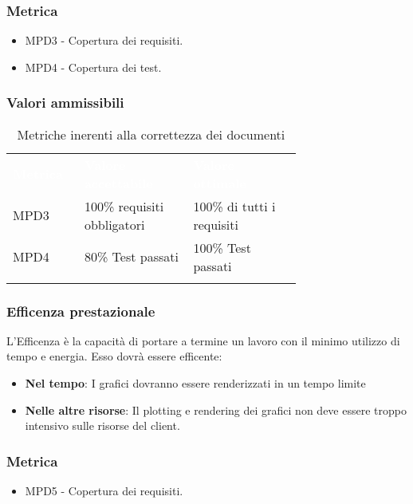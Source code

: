 \subsubsection{Metrica}
\begin{itemize}
    \item MPD3 - Copertura dei requisiti.
    \item MPD4 - Copertura dei test.
\end{itemize}
\subsubsection{Valori ammissibili}
\renewcommand{\arraystretch}{1.5}
\begin{longtable}{p{0.12\linewidth}p{0.30\linewidth}p{0.30\linewidth}}
	\rowcolor[RGB]{33, 73, 50}
	\textcolor{white}{\textbf{Metrica}} & \textcolor{white}{\textbf{Valore accettabile}} & \textcolor{white}{\textbf{Valore ottimale}}\\
    \rowcolor[RGB]{233, 245, 206}
    MPD3 & 100\% requisiti obbligatori & 100\% di tutti i requisiti\\ 
    \rowcolor[RGB]{216, 235, 171} 
    MPD4 & 80\% Test passati & 100\% Test passati\\ 
    \caption{Metriche inerenti alla correttezza dei documenti}
\end{longtable}	
\subsubsection{Efficenza prestazionale}
L'Efficenza è la capacità di portare a termine un lavoro con il minimo utilizzo di tempo e energia. Esso dovrà essere efficente:
\begin{itemize}
    \item \textbf{Nel tempo}: I grafici dovranno essere renderizzati in un tempo limite
    \item \textbf{Nelle altre risorse}: Il plotting e rendering dei grafici non deve essere troppo intensivo sulle risorse del client.
\end{itemize}    
\subsubsection{Metrica}
\begin{itemize}
    \item MPD5 - Copertura dei requisiti.
\end{itemize}
